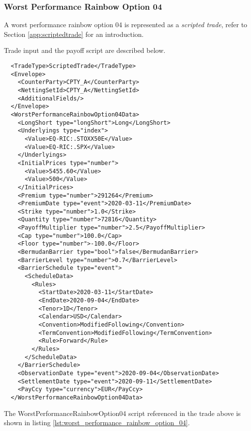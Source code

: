 \subsubsection*{Worst Performance Rainbow Option 04}

A worst performance rainbow option 04 is represented as a {\em scripted trade}, refer to Section \ref{app:scriptedtrade}
for an introduction.

Trade input and the payoff script are described below.

\begin{verbatim}
  <TradeType>ScriptedTrade</TradeType>
  <Envelope>
    <CounterParty>CPTY_A</CounterParty>
    <NettingSetId>CPTY_A</NettingSetId>
    <AdditionalFields/>
  </Envelope>
  <WorstPerformanceRainbowOption04Data>
    <LongShort type="longShort">Long</LongShort>
    <Underlyings type="index">
      <Value>EQ-RIC:.STOXX50E</Value>
      <Value>EQ-RIC:.SPX</Value>
    </Underlyings>
    <InitialPrices type="number">
      <Value>5455.60</Value>
      <Value>500</Value>
    </InitialPrices>
    <Premium type="number">291264</Premium>
    <PremiumDate type="event">2020-03-11</PremiumDate>
    <Strike type="number">1.0</Strike>
    <Quantity type="number">72816</Quantity>
    <PayoffMultiplier type="number">2.5</PayoffMultiplier>
    <Cap type="number">100.0</Cap>
    <Floor type="number">-100.0</Floor>
    <BermudanBarrier type="bool">false</BermudanBarrier>
    <BarrierLevel type="number">0.7</BarrierLevel>
    <BarrierSchedule type="event">
      <ScheduleData>
        <Rules>
          <StartDate>2020-03-11</StartDate>
          <EndDate>2020-09-04</EndDate>
          <Tenor>1D</Tenor>
          <Calendar>USD</Calendar>
          <Convention>ModifiedFollowing</Convention>
          <TermConvention>ModifiedFollowing</TermConvention>
          <Rule>Forward</Rule>
        </Rules>
      </ScheduleData>
    </BarrierSchedule>
    <ObservationDate type="event">2020-09-04</ObservationDate>
    <SettlementDate type="event">2020-09-11</SettlementDate>
    <PayCcy type="currency">EUR</PayCcy>
  </WorstPerformanceRainbowOption04Data>
\end{verbatim}

The WorstPerformanceRainbowOption04 script referenced in the trade above is shown in listing
\ref{lst:worst_performance_rainbow_option_04}.

